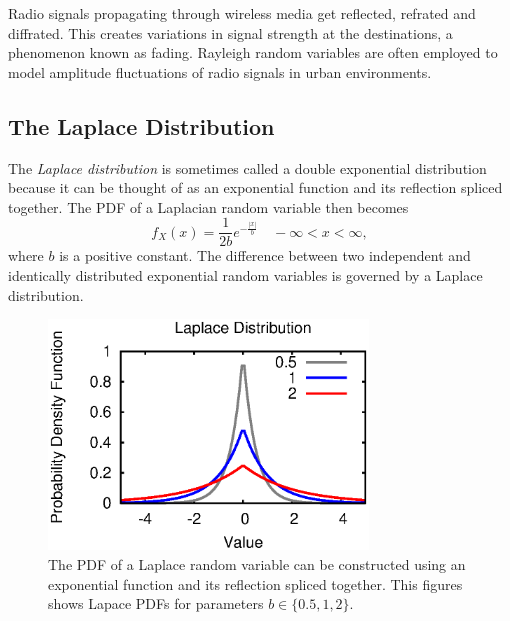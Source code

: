 \begin{example}
Radio signals propagating through wireless media get reflected, refrated and diffrated.
This creates variations in signal strength at the destinations, a phenomenon known as fading.
Rayleigh random variables are often employed to model amplitude fluctuations of radio signals in urban environments.
\end{example}

\subsection{The Laplace Distribution}
The \emph{Laplace distribution} is sometimes called a double exponential distribution because it can be thought of as an exponential function and its reflection spliced together. 
The PDF of a Laplacian random variable then becomes
\begin{equation*}
f_X (x) = \frac{1}{2b} e^{- \frac{|x|}{b}} \quad - \infty < x < \infty,
\end{equation*}
where $b$ is a positive constant.
The difference between two independent and identically distributed exponential random variables is governed by a Laplace distribution.

\begin{figure}[ht]
\begin{center}
\includegraphics[width=8.5cm]{Figures/8chapter/laplace_pdf}
\end{center}
\caption{The PDF of a Laplace random variable can be constructed using an exponential function and its reflection spliced together.
This figures shows Lapace PDFs for parameters $b \in \{0.5, 1, 2 \}$.}
\end{figure}


